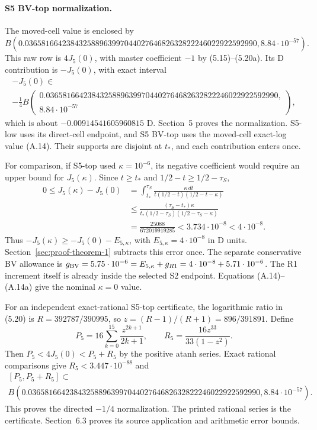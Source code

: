 {\paragraph{S5 BV-top normalization.} The moved-cell value is
enclosed by
\[
 B(0.03658166423843258896399704402764682632822246022922592990,
   8.84\cdot10^{-57}).                                 \tag{A.14}
\]
This raw row is $4J_5(0)$, with master coefficient $-1$ by
(5.15)--(5.20a). Its D contribution is $-J_5(0)$, with exact interval
{\normalsize
\[
\begin{gathered}
 -J_5(0)\in\\
-\frac14 B\left(\begin{gathered}0.03658166423843258896399704402764682632822246022922592990,\\
             8.84\cdot10^{-57}\end{gathered}\right),
\end{gathered}\tag{A.14a}
\]
}
which is about $-0.00914541605960815$ D. Section~5 proves the
normalization. S5-low uses its direct-cell endpoint, and S5 BV-top uses
the moved-cell exact-log value (A.14).
Their supports are disjoint at $t_*$,
and each contribution enters once.

For comparison, if S5-top used $\kappa=10^{-6}$, its negative coefficient
would require an upper bound for $J_5(\kappa)$. Since $t\ge t_*$ and
$1/2-t\ge1/2-\tau_S$,
\[
\begin{aligned}
 0\le J_5(\kappa)-J_5(0)
 &=\int_{t_*}^{\tau_S}
   \frac{\kappa\,dt}{t(1/2-t)(1/2-t-\kappa)}\\
 &\le\frac{(\tau_S-t_*)\kappa}
 {t_*(1/2-\tau_S)(1/2-\tau_S-\kappa)}\\
 &=\frac{25088}{672019919285}<3.734\cdot10^{-8}<4\cdot10^{-8}.
\end{aligned}
\]
Thus $-J_5(\kappa)\ge-J_5(0)-E_{5,\kappa}$,
with $E_{5,\kappa}=4\cdot10^{-8}$ in D units.
Section~\ref{sec:proof-theorem-1} subtracts this error once.
The separate conservative BV allowance is
$g_{\rm BV}=5.75\cdot10^{-6}=E_{5,\kappa}+g_{R1}
=4\cdot10^{-8}+5.71\cdot10^{-6}$.
The R1 increment itself is already inside the selected S2 endpoint.
Equations (A.14)--(A.14a) give the nominal $\kappa=0$ value.

For an independent exact-rational S5-top certificate, the logarithmic
ratio in (5.20) is
$R=392787/390995$, so $z=(R-1)/(R+1)=896/391891$. Define
\[
 P_5=16\sum_{k=0}^{15}\frac{z^{2k+1}}{2k+1},\qquad
 R_5=\frac{16z^{33}}{33(1-z^2)}.
\]
Then $P_5<4J_5(0)<P_5+R_5$ by the positive atanh series.
Exact rational comparisons give $R_5<3.447\cdot10^{-88}$ and
{\normalsize
\[
\begin{gathered}
 [P_5,P_5+R_5]\subset\\
B(0.03658166423843258896399704402764682632822246022922592990,
   8.84\cdot10^{-57}).
\end{gathered}
\]
}
This proves the directed $-1/4$ normalization. The printed rational
series is the certificate. Section~6.3 proves its source application
and arithmetic error bounds.

}
